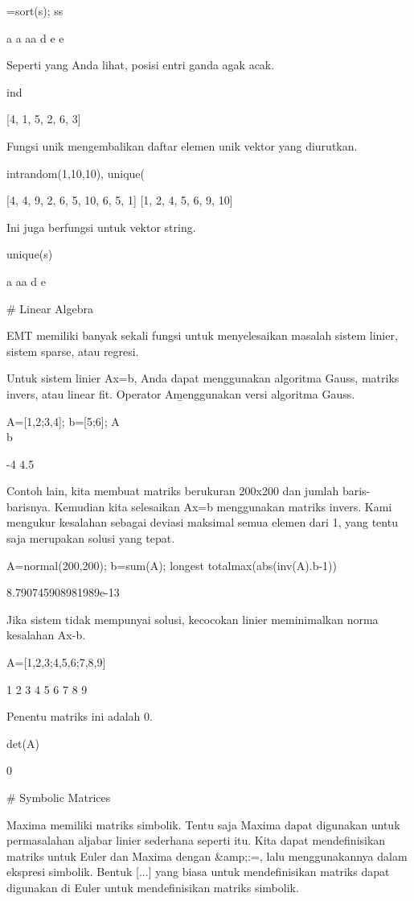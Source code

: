 \documentclass{article}
\begin{document}
=sort(s); ss


    a
    a
    aa
    d
    e
    e

Seperti yang Anda lihat, posisi entri ganda agak acak.


\>ind


    [4,  1,  5,  2,  6,  3]

Fungsi unik mengembalikan daftar elemen unik vektor yang diurutkan.


\>intrandom(1,10,10), unique(%


    [4,  4,  9,  2,  6,  5,  10,  6,  5,  1]
    [1,  2,  4,  5,  6,  9,  10]

Ini juga berfungsi untuk vektor string.


\>unique(s)


    a
    aa
    d
    e

# Linear Algebra

EMT memiliki banyak sekali fungsi untuk menyelesaikan masalah sistem
linier, sistem sparse, atau regresi.


Untuk sistem linier Ax=b, Anda dapat menggunakan algoritma Gauss,
matriks invers, atau linear fit. Operator A\b menggunakan versi
algoritma Gauss.


\>A=[1,2;3,4]; b=[5;6]; A\\b


               -4 
              4.5 

Contoh lain, kita membuat matriks berukuran 200x200 dan jumlah
baris-barisnya. Kemudian kita selesaikan Ax=b menggunakan matriks
invers. Kami mengukur kesalahan sebagai deviasi maksimal semua elemen
dari 1, yang tentu saja merupakan solusi yang tepat.


\>A=normal(200,200); b=sum(A); longest totalmax(abs(inv(A).b-1))


      8.790745908981989e-13 

Jika sistem tidak mempunyai solusi, kecocokan linier meminimalkan
norma kesalahan Ax-b.


\>A=[1,2,3;4,5,6;7,8,9]


                1             2             3 
                4             5             6 
                7             8             9 

Penentu matriks ini adalah 0.


\>det(A)


    0

# Symbolic Matrices

Maxima memiliki matriks simbolik. Tentu saja Maxima dapat digunakan
untuk permasalahan aljabar linier sederhana seperti itu. Kita dapat
mendefinisikan matriks untuk Euler dan Maxima dengan &amp;:=, lalu
menggunakannya dalam ekspresi simbolik. Bentuk [...] yang biasa untuk
mendefinisikan matriks dapat digunakan di Euler untuk mendefinisikan
matriks simbolik.
\end{document}
